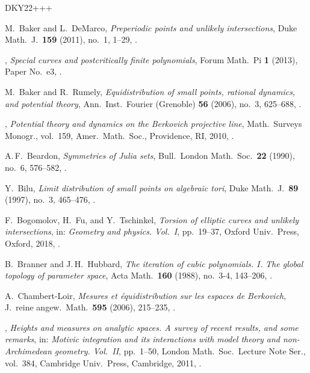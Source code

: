 \documentclass[11pt]{amsart}
\numberwithin{equation}{section}
\theoremstyle{plain}
\theoremstyle{definition}
\theoremstyle{remark}
\begin{document}


\begin{thebibliography}{DKY22+++}
  
M.~Baker and L.~DeMarco,
\emph{Preperiodic points and unlikely intersections},
Duke Math.~J.\ \textbf{159} (2011), no.~1, 1--29,
.

\bysame, 
\emph{Special curves and postcritically finite polynomials},
Forum Math.\ Pi \textbf{1} (2013), Paper No.~e3,
.

M.~Baker and R.~Rumely,
\emph{Equidistribution of small points, rational dynamics, and potential theory}, Ann.\ Inst.\ Fourier (Grenoble) \textbf{56} (2006), no.~3, 625--688,
.

\bysame,
\emph{Potential theory and dynamics on the Berkovich projective line},
Math.\ Surveys  Monogr., vol.~159,
Amer.\ Math.\ Soc., Providence, RI, 2010, .

A.\,F.~Beardon,
\emph{Symmetries of Julia sets},
Bull.\ London Math.\ Soc.\ \textbf{22} (1990), no.~6, 576--582,
.

Y.~Bilu,
\emph{Limit distribution of small points on algebraic tori},
Duke Math.~J.\ \textbf{89} (1997), no.~3, 465--476,
.

F.~Bogomolov, H.~Fu, and Y.~Tschinkel,
\emph{Torsion of elliptic curves and unlikely intersections}, in:
\emph{Geometry and physics. Vol.~I}, pp.~19--37, Oxford Univ.\ Press, Oxford, 2018, .

B.~Branner and J.\,H.~Hubbard,
\emph{The iteration of cubic polynomials. I. The global topology of parameter space},
Acta Math.\ \textbf{160} (1988), no.~3-4, 143--206,
.

A.~Chambert-Loir,
\emph{Mesures et \'equidistribution sur les espaces de Berkovich},
J.~reine angew.\ Math.\ \textbf{595} (2006), 215--235,
.

\bysame,
\emph{Heights and measures on analytic spaces. A survey of recent results, and some remarks},
in: \emph{Motivic integration and its interactions with model theory and non-Archimedean geometry. Vol.~II}, pp.~1--50,
London Math.\ Soc.\ Lecture Note Ser., vol.~384,
Cambridge Univ.\ Press, Cambridge, 2011,
.


\end{thebibliography}
\end{document}
